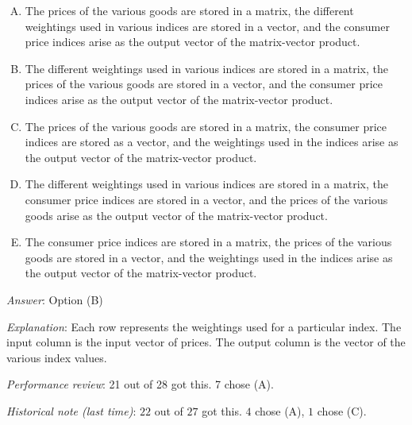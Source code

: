 \documentclass[10pt]{amsart}
\begin{document}
\begin{enumerate}
  \begin{enumerate}[(A)]
  \item The prices of the various goods are stored in a matrix, the
    different weightings used in various indices are stored in a
    vector, and the consumer price indices arise as the output vector
    of the matrix-vector product.
  \item The different weightings used in various indices are stored in
    a matrix, the prices of the various goods are stored in a vector,
    and the consumer price indices arise as the output vector of the
    matrix-vector product.
  \item The prices of the various goods are stored in a matrix, the
    consumer price indices are stored as a vector, and the weightings
    used in the indices arise as the output vector of the
    matrix-vector product.
  \item The different weightings used in various indices are stored in
    a matrix, the consumer price indices are stored in a vector, and
    the prices of the various goods arise as the output vector of the
    matrix-vector product.
  \item The consumer price indices are stored in a matrix, the prices
    of the various goods are stored in a vector, and the weightings
    used in the indices arise as the output vector of the
    matrix-vector product.
  \end{enumerate}

  {\em Answer}: Option (B)

  {\em Explanation}: Each row represents the weightings used for a
  particular index. The input column is the input vector of
  prices. The output column is the vector of the various index values.

  {\em Performance review}: 21 out of 28 got this. 7 chose (A).

  {\em Historical note (last time)}: $22$ out of $27$ got this. $4$ chose (A),
  $1$ chose (C).
\end{enumerate}
\end{document}
